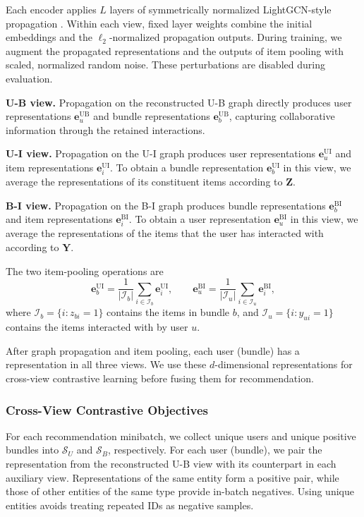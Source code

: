 \documentclass[letterpaper]{article}
\begin{document}
Each encoder applies $L$ layers of symmetrically normalized LightGCN-style propagation \cite{he2020lightgcn}. Within each view, fixed layer weights combine the initial embeddings and the $\ell_2$-normalized propagation outputs. During training, we augment the propagated representations and the outputs of item pooling with scaled, normalized random noise. These perturbations are disabled during evaluation.

\textbf{U-B view.} Propagation on the reconstructed U-B graph directly produces user representations $\mathbf e_u^{\mathrm{UB}}$ and bundle representations $\mathbf e_b^{\mathrm{UB}}$, capturing collaborative information through the retained interactions.

\textbf{U-I view.} Propagation on the U-I graph produces user representations $\mathbf e_u^{\mathrm{UI}}$ and item representations $\mathbf e_i^{\mathrm{UI}}$. To obtain a bundle representation $\mathbf e_b^{\mathrm{UI}}$ in this view, we average the representations of its constituent items according to $\mathbf Z$.

\textbf{B-I view.} Propagation on the B-I graph produces bundle representations $\mathbf e_b^{\mathrm{BI}}$ and item representations $\mathbf e_i^{\mathrm{BI}}$. To obtain a user representation $\mathbf e_u^{\mathrm{BI}}$ in this view, we average the representations of the items that the user has interacted with according to $\mathbf Y$.

The two item-pooling operations are
\begin{equation}
\mathbf e_b^{\mathrm{UI}}
=\frac{1}{|\mathcal I_b|}
\sum_{i\in\mathcal I_b}\mathbf e_i^{\mathrm{UI}},
\qquad
\mathbf e_u^{\mathrm{BI}}
=\frac{1}{|\mathcal I_u|}
\sum_{i\in\mathcal I_u}\mathbf e_i^{\mathrm{BI}},
\tag{12}
\end{equation}
where $\mathcal I_b=\{i:z_{bi}=1\}$ contains the items in bundle $b$, and $\mathcal I_u=\{i:y_{ui}=1\}$ contains the items interacted with by user $u$.

After graph propagation and item pooling, each user (bundle) has a representation in all three views. We use these $d$-dimensional representations for cross-view contrastive learning before fusing them for recommendation.

\subsubsection{Cross-View Contrastive Objectives}

For each recommendation minibatch, we collect unique users and unique positive bundles into $\mathcal S_U$ and $\mathcal S_B$, respectively. For each user (bundle), we pair the representation from the reconstructed U-B view with its counterpart in each auxiliary view. Representations of the same entity form a positive pair, while those of other entities of the same type provide in-batch negatives. Using unique entities avoids treating repeated IDs as negative samples.
\end{document}
